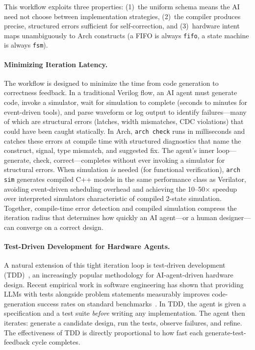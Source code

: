 \documentclass[11pt,twocolumn]{article}
\begin{document}
This workflow exploits three properties: (1)~the uniform schema means the AI need not choose between implementation strategies, (2)~the compiler produces precise, structured errors sufficient for self-correction, and (3)~hardware intent maps unambiguously to Arch constructs (a FIFO is always \texttt{fifo}, a state machine is always \texttt{fsm}).

\paragraph{Minimizing Iteration Latency.}
The workflow is designed to minimize the time from code generation to correctness feedback. In a traditional Verilog flow, an AI agent must generate code, invoke a simulator, wait for simulation to complete (seconds to minutes for event-driven tools), and parse waveform or log output to identify failures---many of which are structural errors (latches, width mismatches, CDC violations) that could have been caught statically. In Arch, \texttt{arch check} runs in milliseconds and catches these errors at compile time with structured diagnostics that name the construct, signal, type mismatch, and suggested fix. The agent's inner loop---generate, check, correct---completes without ever invoking a simulator for structural errors. When simulation \emph{is} needed (for functional verification), \texttt{arch sim} generates compiled C++ models in the same performance class as Verilator, avoiding event-driven scheduling overhead and achieving the 10--50$\times$ speedup over interpreted simulators characteristic of compiled 2-state simulation. Together, compile-time error detection and compiled simulation compress the iteration radius that determines how quickly an AI agent---or a human designer---can converge on a correct design.

\paragraph{Test-Driven Development for Hardware Agents.}
A natural extension of this tight iteration loop is test-driven development (TDD)~\cite{beck2003tdd}, an increasingly popular methodology for AI-agent-driven hardware design. Recent empirical work in software engineering has shown that providing LLMs with tests alongside problem statements measurably improves code-generation success rates on standard benchmarks~\cite{mathews2024tdd}. In TDD, the agent is given a specification and a test suite \emph{before} writing any implementation. The agent then iterates: generate a candidate design, run the tests, observe failures, and refine. The effectiveness of TDD is directly proportional to how fast each generate-test-feedback cycle completes.
\end{document}
